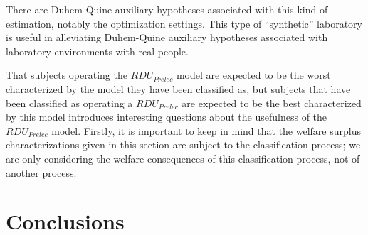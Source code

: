 \documentclass[../main.tex]{subfiles}
\begin{document}
There are Duhem-Quine auxiliary hypotheses associated with this kind of estimation, notably the optimization settings.
This type of \enquote{synthetic} laboratory is useful in alleviating Duhem-Quine auxiliary hypotheses associated with laboratory environments with real people.


That subjects operating the $\mathit{RDU_{Prelec}}$ model are expected to be the worst characterized by the model they have been classified as, but subjects that have been classified as operating a $\mathit{RDU_{Prelec}}$ are expected to be the best characterized by this model introduces interesting questions about the usefulness of the $\mathit{RDU_{Prelec}}$ model.
Firstly, it is important to keep in mind that the welfare surplus characterizations given in this section are subject to the classification process; we are only considering the welfare consequences of this classification process, not of another process.

\section{Conclusions}



\onlyinsubfile{
\newpage
\printbibliography[segment=4, heading=subbibliography]
}
\end{document}
